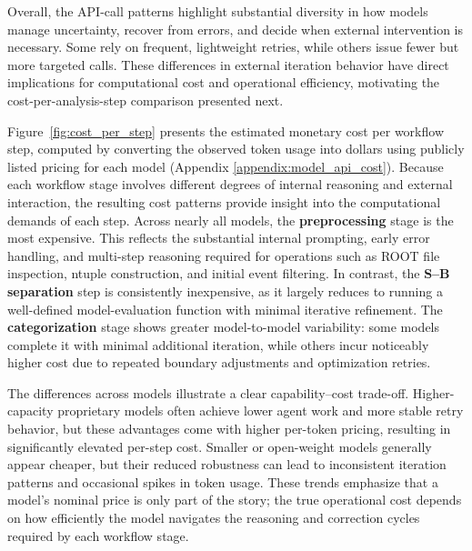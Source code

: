 \documentclass[aps,prd,reprint,superscriptaddress]{revtex4-2}
\begin{document}
Overall, the API-call patterns highlight substantial diversity in how models manage uncertainty, recover from errors, and decide when external intervention is necessary. Some rely on frequent, lightweight retries, while others issue fewer but more targeted calls. These differences in external iteration behavior have direct implications for computational cost and operational efficiency, motivating the cost-per-analysis-step comparison presented next.

Figure~\ref{fig:cost_per_step} presents the estimated monetary cost per workflow step, computed by converting the observed token usage into dollars using publicly listed pricing for each model (Appendix \ref{appendix:model_api_cost}). Because each workflow stage involves different degrees of internal reasoning and external interaction, the resulting cost patterns provide insight into the computational demands of each step. Across nearly all models, the \textbf{preprocessing} stage is the most expensive. This reflects the substantial internal prompting, early error handling, and multi-step reasoning required for operations such as ROOT file inspection, ntuple construction, and initial event filtering. In contrast, the \textbf{S–B separation} step is consistently inexpensive, as it largely reduces to running a well-defined model-evaluation function with minimal iterative refinement. The \textbf{categorization} stage shows greater model-to-model variability: some models complete it with minimal additional iteration, while others incur noticeably higher cost due to repeated boundary adjustments and optimization retries.

The differences across models illustrate a clear capability–cost trade-off. Higher-capacity proprietary models often achieve lower agent work and more stable retry behavior, but these advantages come with higher per-token pricing, resulting in significantly elevated per-step cost. Smaller or open-weight models generally appear cheaper, but their reduced robustness can lead to inconsistent iteration patterns and occasional spikes in token usage. These trends emphasize that a model’s nominal price is only part of the story; the true operational cost depends on how efficiently the model navigates the reasoning and correction cycles required by each workflow stage.
\end{document}
